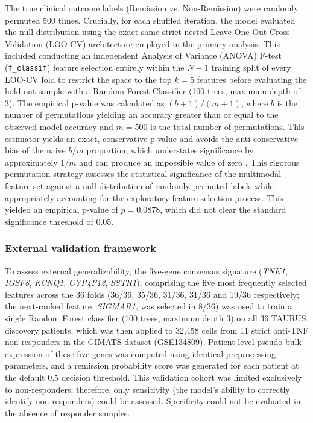 \documentclass{bmcart}
\begin{document}
The true clinical outcome labels (Remission vs. Non-Remission) were randomly permuted 500 times. Crucially, for each shuffled iteration, the model evaluated the null distribution using the exact same strict nested Leave-One-Out Cross-Validation (LOO-CV) architecture employed in the primary analysis. This included conducting an independent Analysis of Variance (ANOVA) F-test (\texttt{f\_classif}) feature selection entirely within the $N-1$ training split of every LOO-CV fold to restrict the space to the top $k=5$ features before evaluating the hold-out sample with a Random Forest Classifier \cite{breiman} (100 trees, maximum depth of 3). The empirical p-value was calculated as $(b+1)/(m+1)$, where $b$ is the number of permutations yielding an accuracy greater than or equal to the observed model accuracy and $m=500$ is the total number of permutations. This estimator yields an exact, conservative p-value and avoids the anti-conservative bias of the naive $b/m$ proportion, which understates significance by approximately $1/m$ and can produce an impossible value of zero \cite{phipson}. This rigorous permutation strategy assesses the statistical significance of the multimodal feature set against a null distribution of randomly permuted labels while appropriately accounting for the exploratory feature selection process. This yielded an empirical p-value of $p=0.0878$, which did not clear the standard significance threshold of 0.05.

\subsubsection*{External validation framework}
To assess external generalizability, the five-gene consensus signature (\textit{TNK1}, \textit{IGSF8}, \textit{KCNQ1}, \textit{CYP4F12}, \textit{SSTR1}), comprising the five most frequently selected features across the 36 folds (36/36, 35/36, 31/36, 31/36 and 19/36 respectively; the next-ranked feature, \textit{SIGMAR1}, was selected in 8/36) was used to train a single Random Forest classifier (100 trees, maximum depth 3) on all 36 TAURUS discovery patients, which was then applied to 32,458 cells from 11 strict anti-TNF non-responders in the GIMATS dataset (GSE134809). Patient-level pseudo-bulk expression of these five genes was computed using identical preprocessing parameters, and a remission probability score was generated for each patient at the default 0.5 decision threshold. This validation cohort was limited exclusively to non-responders; therefore, only sensitivity (the model's ability to correctly identify non-responders) could be assessed. Specificity could not be evaluated in the absence of responder samples.
\end{document}
